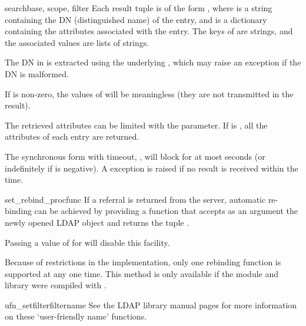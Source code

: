 \begin{methoddesc}[int]{search}{base, scope, filter}
Each result tuple is of the form , 
where  is a string containing
the DN (distinguished name) of the entry, and 
 is a dictionary
containing the attributes associated with the entry. 
The keys of  are strings, 
and the associated values are lists of strings.

The DN in  is extracted using the underlying ,
which may raise an exception if the DN is malformed.

If  is non-zero, the values of  will be meaningless
(they are not transmitted in the result).

The retrieved attributes can be limited with the  parameter.
If  is , all the attributes of each entry are returned.

The synchronous form with timeout, , will block for at most
 seconds (or indefinitely if  is negative). A
 exception is raised if no result is received within the
time.
\end{methoddesc}


\begin{methoddesc}{set_rebind_proc}{func}
If a referral is returned from the server, automatic
re-binding can be achieved by providing a function that accepts as an argument
the newly opened LDAP object and returns the tuple .

Passing a value of  for  will disable
this facility. 

Because of restrictions in the implementation, only one
rebinding function is supported at any one time. This method is only
available if the module and library were compiled with .
\end{methoddesc}


\begin{methoddesc}{ufn_setfilter}{filtername}
See the LDAP library manual pages for more information on these
`user-friendly name' functions.
\end{methoddesc}

